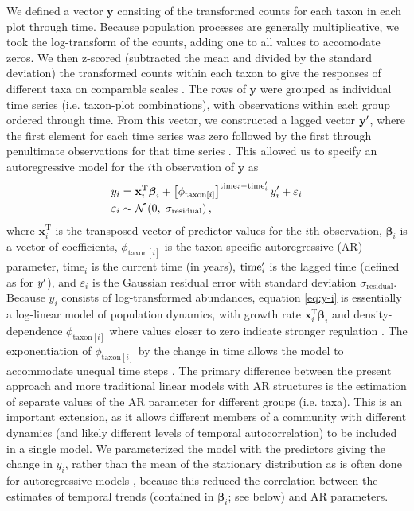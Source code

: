 We defined a vector $\mathbf{y}$ consiting of the transformed counts
for each taxon in each plot through time.
Because population processes are generally multiplicative,
we took the log-transform of the counts,
adding one to all values to accomodate zeros.
We then z-scored (subtracted the mean and divided by the standard deviation)
the transformed counts within each taxon
to give the responses of different taxa on comparable scales \citep{Jackson2012}.
The rows of $\mathbf{y}$ were grouped as individual time series
(i.e. taxon-plot combinations),
with observations within each group ordered through time.
From this vector,
we constructed a lagged vector $\mathbf{y\sp{\prime}}$,
where the first element for each time series was zero
followed by the first through
penultimate observations for that time series \citep{Ives2006}.
This allowed us to specify an autoregressive model for the $i$th observation of
$\mathbf{y}$ as
%
\begin{equation} \label{eq:y-i}
\begin{split}
    y_i &= \mathbf{x}_i^\text{T} {\boldsymbol\beta}_i +
        \left[ \phi_{\text{taxon}[i]} \right]^{\text{time}_i - \text{time}\sp{\prime}_i}
        y\sp{\prime}_i + \varepsilon_i \\
    \varepsilon_i &\sim \mathcal{N} \left(0, \; \sigma_{\text{residual}} \right)
    \text{,}
\end{split}
\end{equation}
%
\noindent where $\mathbf{x}_i^\text{T}$ is the transposed vector
of predictor values for the $i$th observation,
${\boldsymbol\beta}_i$ is a vector of coefficients,
$\phi_{\text{taxon}[i]}$ is the taxon-specific autoregressive (AR) parameter,
$\text{time}_i$ is the current time (in years),
$\text{time}\sp{\prime}_i$ is the lagged time (defined as for  $y\sp{\prime}$),
and $\varepsilon_i$  is the Gaussian residual
error with standard deviation $\sigma_{\text{residual}}$.
Because $y_i$ consists of log-transformed abundances, equation \ref{eq:y-i} is
essentially a log-linear model of population dynamics, with growth rate
$\mathbf{x}_i^\text{T} {\boldsymbol\beta}_i$ and
density-dependence $\phi_{\text{taxon}[i]}$
where values closer to zero indicate stronger regulation \citep{Ives2010, Ziebarth2010}.
The exponentiation of $\phi_{\text{taxon}[i]}$ by the change in time allows the model
to accommodate unequal time steps \citep{Zuur2009}.
The primary difference between the present approach and more traditional linear models
with AR structures \citep[e.g., ][]{Zuur2009} is the estimation of separate values of the AR
parameter for different groups (i.e. taxa).
This is an important extension, as it allows different members of a community with
different dynamics (and likely different levels of temporal autocorrelation)
to be included in a single model.
We parameterized the model with the predictors giving the change in $y_i$,
rather than the mean of the stationary distribution as is often done
for autoregressive models \citep{Harvey1990, Ives2006},
because this reduced the correlation between the estimates of temporal trends
(contained in ${\boldsymbol\beta}_i$; see below) and AR parameters.

